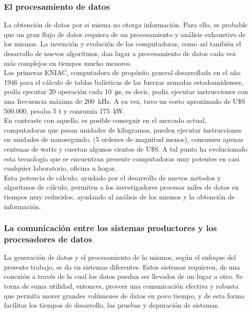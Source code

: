 
\subsubsection*{El procesamiento de datos}
La obtención de datos por si misma no otorga información. Para ello, es probable que un gran flujo de datos requiera de un procesamiento y análisis exhaustivo de los mismos. La invención y evolución de las computadoras, como así también el desarrollo de nuevos algoritmos, dan lugar a procesamiento de datos cada vez más complejos en tiempos mucho menores.\\

Las primeras ENIAC, computadora de propósito general desarrollada en el año 1946 para el cálculo de tablas balísticas de las fuerzas armadas estadounidenses, podía ejecutar 20 operación cada \SI{10}{\micro\second}, es decir, podía ejecutar instrucciones con una frecuencia máxima de \SI{200}{\kilo\hertz}. A su vez, tuvo un costo aproximado de U\$S 500.000, pesaba 5 t y consumía \SI{175}{\kilo\watt}.\\

En contraste con aquello, es posible conseguir en el mercado actual, computadoras que pesan unidades de kilogramos, pueden ejecutar instrucciones en unidades de nanosegundo, (5 ordenes de magnitud menos), consumen apenas centenas de watts y cuestan algunos cientos de U\$S. A tal punto ha evolucionado esta tecnología que se encuentran presente computadoras muy potentes en casi cualquier laboratorio, oficina u hogar.\\

Esta potencia de cálculo, ayudado por el desarrollo de nuevos métodos y algoritmos de cálculo, permiten a los investigadores procesar miles de datos en tiempos muy reducidos, ayudando al análisis de los mismos y la obtención de información.\\

\subsubsection*{La comunicación entre los sistemas productores y los procesadores de datos}
La generación de datos y el procesamiento de lo mismos, según el enfoque del presente trabajo, se da en sistemas diferentes. Estos sistemas requieren, de una conexión a través de la cual los datos puedan ser llevados de un lugar a otro. Se torna de suma utilidad, entonces, proveer una comunicación efectiva y robusta que permita mover grandes volúmenes de datos en poco tiempo, y de esta forma facilitar los tiempos de desarrollo, las pruebas y depuración de sistemas.\\

